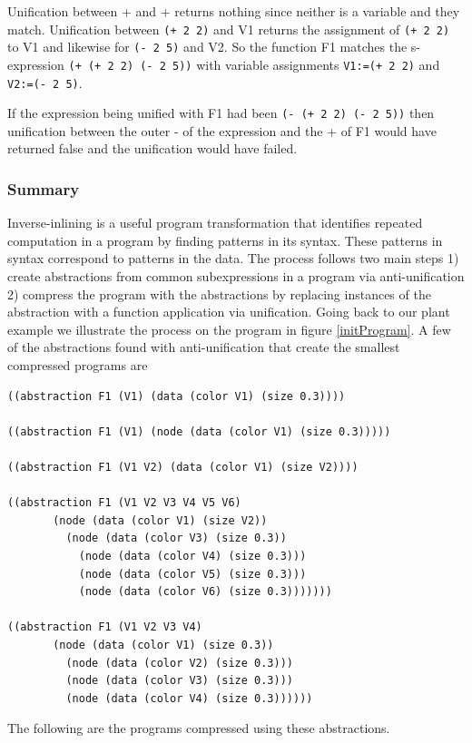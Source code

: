 \documentclass[a4paper,10pt]{article}
\begin{document}
Unification between + and + returns nothing since neither is a variable and they match.  Unification between \texttt{(+ 2 2)} and V1 returns the assignment of \texttt{(+ 2 2)} to V1 and likewise for \texttt{(- 2 5)} and V2.  So the function F1 matches the s-expression \texttt{(+ (+ 2 2) (- 2 5))} with variable assignments \texttt{V1:=(+ 2 2)} and \texttt{V2:=(- 2 5)}.

If the expression being unified with F1 had been \texttt{(- (+ 2 2) (- 2 5))} then unification between the outer - of the expression and the + of F1 would have returned false and the unification would have failed.

\subsubsection{Summary}
Inverse-inlining is a useful program transformation that identifies repeated computation in a program by finding patterns in its syntax.  These patterns in syntax correspond to patterns in the data.  The process follows two main steps 1) create abstractions from common subexpressions in a program via anti-unification 2) compress the program with the abstractions by replacing instances of the abstraction with a function application via unification.  Going back to our plant example we illustrate the process on the program in figure \ref{initProgram}.
A few of the abstractions found with anti-unification that create the smallest compressed programs are 
\begin{verbatim}
((abstraction F1 (V1) (data (color V1) (size 0.3))))

((abstraction F1 (V1) (node (data (color V1) (size 0.3)))))

((abstraction F1 (V1 V2) (data (color V1) (size V2))))

((abstraction F1 (V1 V2 V3 V4 V5 V6)
       (node (data (color V1) (size V2))
         (node (data (color V3) (size 0.3))
           (node (data (color V4) (size 0.3)))
           (node (data (color V5) (size 0.3)))
           (node (data (color V6) (size 0.3)))))))

((abstraction F1 (V1 V2 V3 V4)
       (node (data (color V1) (size 0.3))
         (node (data (color V2) (size 0.3)))
         (node (data (color V3) (size 0.3)))
         (node (data (color V4) (size 0.3))))))
\end{verbatim}
The following are the programs compressed using these abstractions.
\end{document}
